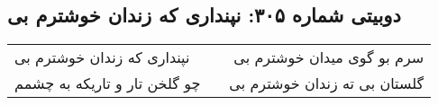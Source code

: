 \begin{center}
\section*{دوبیتی شماره ۳۰۵: نپنداری که زندان خوشترم بی}
\label{sec:305}
\begin{longtable}{l p{0.5cm} r}
نپنداری که زندان خوشترم بی
&&
سرم بو گوی میدان خوشترم بی
\\
چو گلخن تار و تاریکه به چشمم
&&
گلستان بی ته زندان خوشترم بی
\\
\end{longtable}
\end{center}
